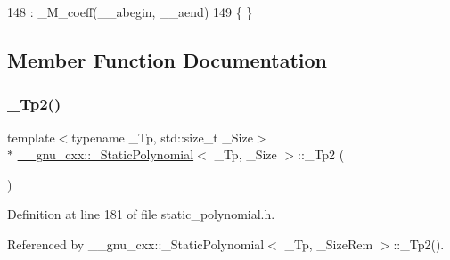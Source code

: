 \begin{DoxyCode}
148         : \_M\_coeff(\_\_abegin, \_\_aend)
149         \{ \}
\end{DoxyCode}


\subsection{Member Function Documentation}
\mbox{\label{class____gnu__cxx_1_1__StaticPolynomial_a688f26b7c706701416fad299240aa856}} 
\subsubsection{\texorpdfstring{\+\_\+\+Tp2()}{\_Tp2()}}
{\footnotesize\ttfamily template$<$typename \+\_\+\+Tp, std\+::size\+\_\+t \+\_\+\+Size$>$ \\
$\ast$ \hyperlink{class____gnu__cxx_1_1__StaticPolynomial}{\+\_\+\+\_\+gnu\+\_\+cxx\+::\+\_\+\+Static\+Polynomial}$<$ \+\_\+\+Tp, \+\_\+\+Size $>$\+::\+\_\+\+Tp2 (\begin{DoxyParamCaption}{ }\end{DoxyParamCaption})\hspace{0.3cm}{\ttfamily [inline]}}



Definition at line 181 of file static\+\_\+polynomial.\+h.



Referenced by \+\_\+\+\_\+gnu\+\_\+cxx\+::\+\_\+\+Static\+Polynomial$<$ \+\_\+\+Tp, \+\_\+\+Size\+Rem $>$\+::\+\_\+\+Tp2().


